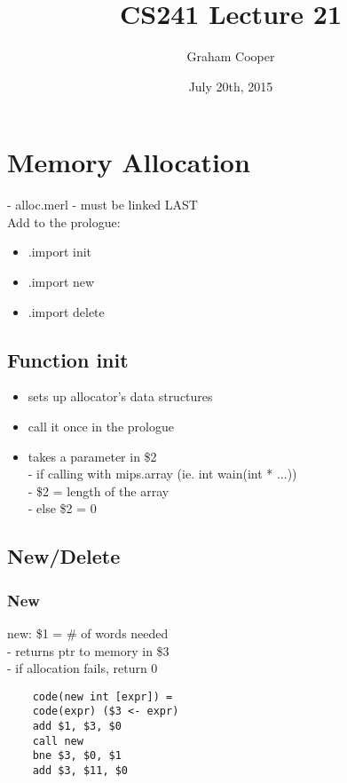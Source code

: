 \documentclass[12pt]{article}
\title{\vspace{-15ex}CS241 Lecture 21\vspace{-1ex}}
\date{July 20th, 2015}
\author{Graham Cooper}
\begin{document}
	\maketitle
	
	\section*{Memory Allocation}
	- alloc.merl - must be linked LAST\\
	
	Add to the prologue:\\
	\begin{itemize}
		\item .import init
		\item .import new
		\item .import delete
	\end{itemize}
	
	\subsection*{Function init}
	\begin{itemize}
		\item sets up allocator's data structures
		\item call it once in the prologue
		\item takes a parameter in \$2\\
		- if calling with mips.array (ie. int wain(int * ...))\\
		- \$2 = length of the array\\
		- else \$2 = 0\\
	\end{itemize}
	
	\subsection*{New/Delete}
	\subsubsection*{New}
	new: \$1 = \# of words needed\\
	- returns ptr to memory in \$3\\
	- if allocation fails, return 0\\
	\begin{verbatim}
	code(new int [expr]) = 
	code(expr) ($3 <- expr)
	add $1, $3, $0
	call new
	bne $3, $0, $1
	add $3, $11, $0
	\end{verbatim}
	
\end{document}
